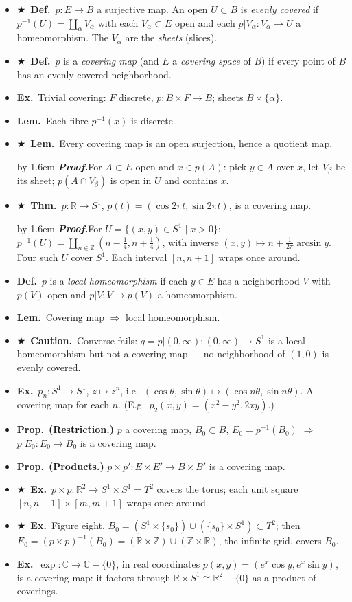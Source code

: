 \documentclass[12pt,a4paper]{article}
\newcommand{\Dfn}{\textbf{Def.}~}
\newcommand{\Thm}{\textbf{Thm.}~}
\newcommand{\Lem}{\textbf{Lem.}~}
\newcommand{\Prp}{\textbf{Prop.}~}
\newcommand{\Exa}{\textbf{Ex.}~}
\newcommand{\Warn}{\textbf{Caution.}~}
\newcommand{\Key}{$\bigstar$~}                  %
\newcommand{\Pf}[1]{%
  \par\addvspace{7pt}\nopagebreak
  \begingroup
    \advance\leftskip by 1.6em
    \parindent=0pt \small\color{prf}%
    \textbf{\textit{Proof.}}\enspace #1\par
  \endgroup
  \addvspace{9pt}}
\newenvironment{BL}%
  {\begin{itemize}[leftmargin=1.4em,labelsep=0.55em,itemsep=11pt,topsep=11pt,parsep=0pt]}%
  {\end{itemize}}
\newcommand{\RR}{\mathbb{R}}
\newcommand{\ZZ}{\mathbb{Z}}
\newcommand{\CX}{\mathbb{C}}
\newcommand{\imp}{\Rightarrow}
\begin{document}
\begin{BL}
\item \Key\Dfn $p\colon E\to B$ a surjective map. An open $U\subset B$ is \emph{evenly covered}
      if \(p^{-1}(U)=\coprod_\alpha V_\alpha\) with each $V_\alpha\subset E$ open and each
      $p|V_\alpha\colon V_\alpha\to U$ a homeomorphism. The $V_\alpha$ are the \emph{sheets}
      (slices).
\item \Key\Dfn $p$ is a \emph{covering map} (and $E$ a \emph{covering space} of $B$) if every
      point of $B$ has an evenly covered neighborhood.
\item \Exa Trivial covering: $F$ discrete, $p\colon B\times F\to B$; sheets $B\times\{\alpha\}$.
\item \Lem Each fibre $p^{-1}(x)$ is discrete.
\item \Key\Lem Every covering map is an open surjection, hence a quotient map.
\Pf{For $A\subset E$ open and $x\in p(A)$: pick $y\in A$ over $x$, let $V_\beta$ be its sheet;
$p(A\cap V_\beta)$ is open in $U$ and contains $x$.}
\item \Key\Thm $p\colon\RR\to S^1$, \; $p(t)=(\cos2\pi t,\sin2\pi t)$, is a covering map.
\Pf{For $U=\{(x,y)\in S^1\mid x>0\}$: $p^{-1}(U)=\coprod_{n\in\ZZ}(n-\tfrac14,n+\tfrac14)$,
with inverse $(x,y)\mapsto n+\frac1{2\pi}\arcsin y$. Four such $U$ cover $S^1$.
Each interval $[n,n+1]$ wraps once around.}
\item \Dfn $p$ is a \emph{local homeomorphism} if each $y\in E$ has a neighborhood $V$ with
      $p(V)$ open and $p|V\colon V\to p(V)$ a homeomorphism.
\item \Lem Covering map $\imp$ local homeomorphism.
\item \Key\Warn Converse fails: $q=p|(0,\infty)\colon(0,\infty)\to S^1$ is a local
      homeomorphism but not a covering map --- no neighborhood of $(1,0)$ is evenly covered.
\item \Exa $p_n\colon S^1\to S^1$, $z\mapsto z^n$, i.e.\
      $(\cos\theta,\sin\theta)\mapsto(\cos n\theta,\sin n\theta)$. A covering map for each $n$.
      (E.g.\ $p_2(x,y)=(x^2-y^2,2xy)$.)
\item \Prp \textbf{(Restriction.)} $p$ a covering map, $B_0\subset B$, $E_0=p^{-1}(B_0)$
      $\imp$ $p|E_0\colon E_0\to B_0$ is a covering map.
\item \Prp \textbf{(Products.)} $p\times p'\colon E\times E'\to B\times B'$ is a covering map.
\item \Key\Exa $p\times p\colon\RR^2\to S^1\times S^1=T^2$ covers the torus;
      each unit square $[n,n+1]\times[m,m+1]$ wraps once around.
\item \Key\Exa Figure eight. $B_0=(S^1\times\{s_0\})\cup(\{s_0\}\times S^1)\subset T^2$;
      then $E_0=(p\times p)^{-1}(B_0)=(\RR\times\ZZ)\cup(\ZZ\times\RR)$,
      the infinite grid, covers $B_0$.
\item \Exa $\exp\colon\CX\to\CX-\{0\}$, in real coordinates
      $p(x,y)=(e^x\cos y,e^x\sin y)$, is a covering map: it factors through
      $\RR\times S^1\cong\RR^2-\{0\}$ as a product of coverings.
\end{BL}
\end{document}
